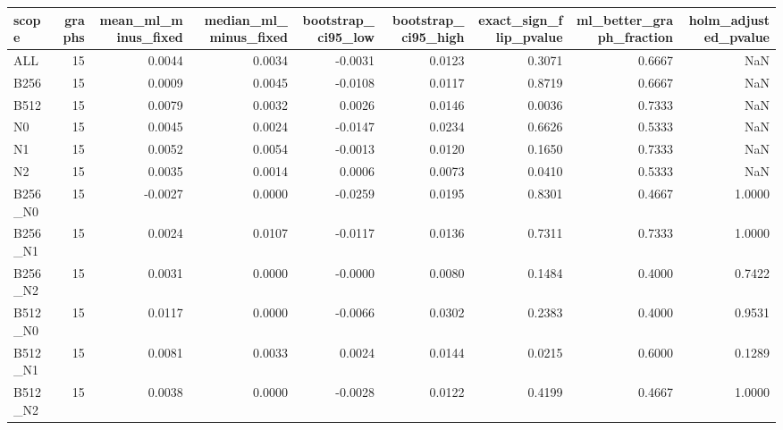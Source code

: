\begin{tabular}{lrrrrrrrr}
\toprule
scope & graphs & mean_ml_minus_fixed & median_ml_minus_fixed & bootstrap_ci95_low & bootstrap_ci95_high & exact_sign_flip_pvalue & ml_better_graph_fraction & holm_adjusted_pvalue \\
\midrule
ALL & 15 & 0.0044 & 0.0034 & -0.0031 & 0.0123 & 0.3071 & 0.6667 & NaN \\
B256 & 15 & 0.0009 & 0.0045 & -0.0108 & 0.0117 & 0.8719 & 0.6667 & NaN \\
B512 & 15 & 0.0079 & 0.0032 & 0.0026 & 0.0146 & 0.0036 & 0.7333 & NaN \\
N0 & 15 & 0.0045 & 0.0024 & -0.0147 & 0.0234 & 0.6626 & 0.5333 & NaN \\
N1 & 15 & 0.0052 & 0.0054 & -0.0013 & 0.0120 & 0.1650 & 0.7333 & NaN \\
N2 & 15 & 0.0035 & 0.0014 & 0.0006 & 0.0073 & 0.0410 & 0.5333 & NaN \\
B256_N0 & 15 & -0.0027 & 0.0000 & -0.0259 & 0.0195 & 0.8301 & 0.4667 & 1.0000 \\
B256_N1 & 15 & 0.0024 & 0.0107 & -0.0117 & 0.0136 & 0.7311 & 0.7333 & 1.0000 \\
B256_N2 & 15 & 0.0031 & 0.0000 & -0.0000 & 0.0080 & 0.1484 & 0.4000 & 0.7422 \\
B512_N0 & 15 & 0.0117 & 0.0000 & -0.0066 & 0.0302 & 0.2383 & 0.4000 & 0.9531 \\
B512_N1 & 15 & 0.0081 & 0.0033 & 0.0024 & 0.0144 & 0.0215 & 0.6000 & 0.1289 \\
B512_N2 & 15 & 0.0038 & 0.0000 & -0.0028 & 0.0122 & 0.4199 & 0.4667 & 1.0000 \\
\bottomrule
\end{tabular}
